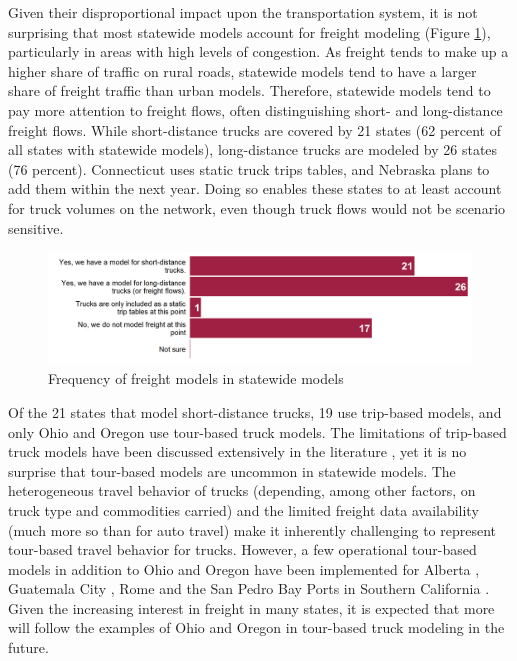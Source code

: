 Given their disproportional impact upon the transportation system, it is not surprising that most statewide models account for freight modeling (Figure \ref{fig:freight-models-frequency}), particularly in areas with high levels of congestion. As freight tends to make up a higher share of traffic on rural roads, statewide models tend to have a larger share of freight traffic than urban models. Therefore, statewide models tend to pay more attention to freight flows, often distinguishing short- and long-distance freight flows. While short-distance trucks are covered by 21 states (62 percent of all states with statewide models), long-distance trucks are modeled by 26 states (76 percent). Connecticut uses static truck trips tables, and Nebraska plans to add them within the next year. Doing so enables these states to at least account for truck volumes on the network, even though truck flows would not be scenario sensitive.

\begin{figure}   %
\centering
\includegraphics[width=6.4in]{graphics/22-freight-models-frequency}
\caption{Frequency of freight models in statewide models}
\label{fig:freight-models-frequency}
\end{figure}

Of the 21 states that model short-distance trucks, 19 use trip-based models, and only Ohio and Oregon use tour-based truck models. The limitations of trip-based truck models have been discussed extensively in the literature \citep{holguinveras13}, yet it is no surprise that tour-based models are uncommon in statewide models. The heterogeneous travel behavior of trucks (depending, among other factors, on truck type and commodities carried) and the limited freight data availability (much more so than for auto travel) make it inherently challenging to represent tour-based travel behavior for trucks. However, a few operational tour-based models in addition to Ohio and Oregon have been implemented for Alberta \citep{hunt07}, Guatemala City \citep{holguinveras03}, Rome \citep{nuzzolo13} and the San Pedro Bay Ports in Southern California \citep{you12}. Given the increasing interest in freight in many states, it is expected that more will follow the examples of Ohio and Oregon in tour-based truck modeling in the future.

